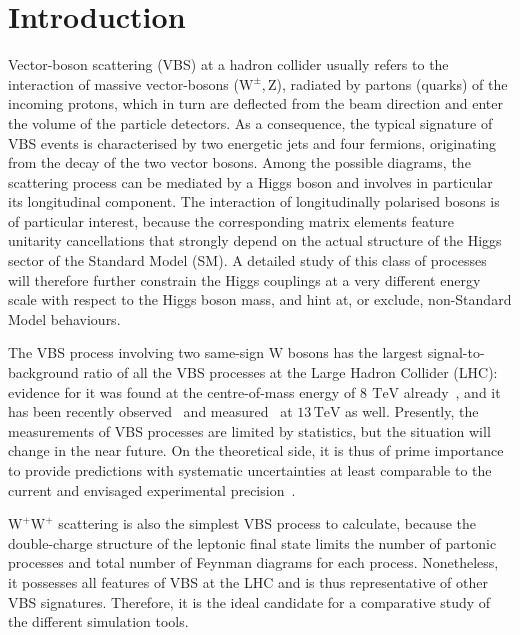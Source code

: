 \documentclass[twocolumn,epjc3]{svjour3} %
\newcommand{\PW}{\ensuremath{\text{W}}\xspace}
\newcommand{\PZ}{\ensuremath{\text{Z}}\xspace}
\newcommand{\TeV}{\ensuremath{\,\text{TeV}}\xspace}
\begin{document}
\newpage

\section{Introduction}
Vector-boson scattering (VBS) at a hadron collider 
usually refers to the interaction of massive vector-bosons ($\PW^\pm,\PZ$),
radiated by partons (quarks) of the incoming protons, 
which in turn are deflected from the beam direction 
and enter the volume of the particle detectors.
As a consequence, the typical signature of VBS events
is characterised by two energetic jets 
and four fermions,
originating from the decay of the two vector bosons.
Among the possible diagrams,
the scattering process can be mediated by a Higgs boson
and involves in particular its longitudinal component.
The interaction of longitudinally polarised bosons is of particular interest, 
because the corresponding matrix elements feature unitarity cancellations 
that strongly depend on the actual structure of the Higgs sector of the Standard Model (SM).
A detailed study of this class of processes will therefore further constrain the Higgs couplings 
at a very different energy scale with respect to the Higgs boson mass,
and hint at, or exclude, non-Standard Model behaviours.

The VBS process involving two same-sign $\PW$ bosons has the largest signal-to-background ratio of all the VBS processes at the Large Hadron Collider (LHC):
evidence for it was found at the centre-of-mass energy of $8~\TeV$ already~\cite{Aad:2014zda,Khachatryan:2014sta},
and it has been recently observed~\cite{Sirunyan:2017ret} and measured~\cite{Aaboud:2016ffv} 
at $13\TeV$ as well.
Presently, the measurements of VBS processes are limited by statistics, but the situation will change in the near future.
On the theoretical side, 
it is thus of prime importance to provide predictions with systematic uncertainties
at least comparable to the current and envisaged experimental precision~\cite{CMS:2016rcn}.


$\PW^+\PW^+$ scattering is also the simplest VBS process to calculate, 
because the double-charge structure of the leptonic final state 
limits the number of partonic processes and total number of Feynman diagrams for each process.
Nonetheless, it possesses all features of VBS at the LHC and is thus representative of other VBS signatures.
Therefore, it is the ideal candidate for a comparative study of the different simulation tools.
\end{document}
